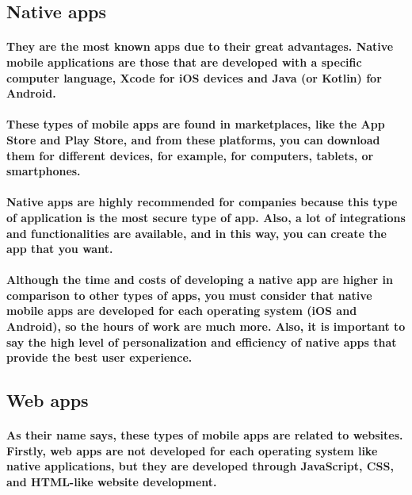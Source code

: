 \documentclass[12pt,a4paper]{article}
\begin{document}
    \subsection{Native apps}

    \paragraph{They are the most known apps due to their great advantages. Native mobile applications are those that are developed with a specific computer language, Xcode for iOS devices and Java (or Kotlin) for Android.}
    
    \paragraph{These types of mobile apps are found in marketplaces, like the App Store and Play Store, and from these platforms, you can download them for different devices, for example, for computers, tablets, or smartphones. }
    
    \paragraph{Native apps are highly recommended for companies because this type of application is the most secure type of app. Also, a lot of integrations and functionalities are available, and in this way, you can create the app that you want.}
    
    \paragraph{Although the time and costs of developing a native app are higher in comparison to other types of apps, you must consider that native mobile apps are developed for each operating system (iOS and Android), so the hours of work are much more. Also, it is important to say the high level of personalization and efficiency of native apps that provide the best user experience.}

    \subsection{Web apps}

    \paragraph{As their name says, these types of mobile apps are related to websites. Firstly, web apps are not developed for each operating system like native applications, but they are developed through JavaScript, CSS, and HTML-like website development. }
    
\end{document}
